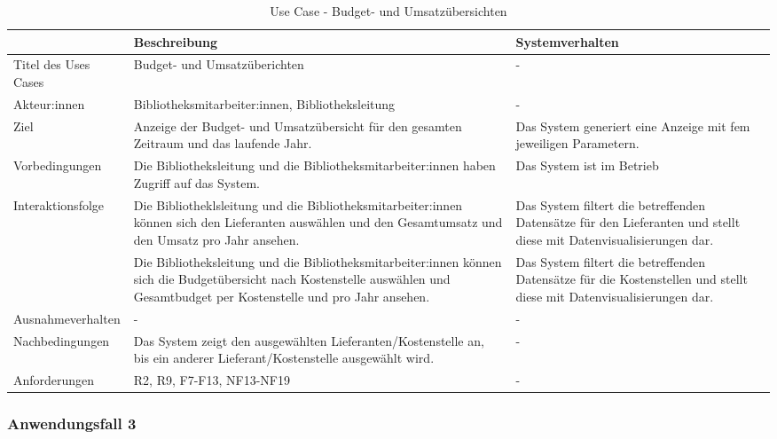 \begingroup
\setlength{\tabcolsep}{10pt} %
\renewcommand{\arraystretch}{1.25} 
\begin{table}[H]
    \centering
    \begin{adjustbox}{max width=\textwidth}
    \begin{tabular}{lp{6.5cm}p{6.5cm}}
       \toprule
       \textbf{}          & \textbf{Beschreibung} &\textbf{Systemverhalten}\\
       \midrule
        Titel des Uses Cases             &Budget- und Umsatzüberichten  & -\\
        Akteur:innen                     &Bibliotheksmitarbeiter:innen, Bibliotheksleitung & -\\
        Ziel                             &Anzeige der Budget- und Umsatzübersicht für den gesamten Zeitraum und das laufende Jahr. & Das System generiert eine Anzeige mit fem jeweiligen Parametern.\\
        Vorbedingungen                   &Die Bibliotheksleitung und die Bibliotheksmitarbeiter:innen haben Zugriff auf das System.& Das System ist im Betrieb\\
        Interaktionsfolge                &Die Bibliotheklsleitung und die Bibliotheksmitarbeiter:innen  können sich den Lieferanten auswählen und den Gesamtumsatz und den Umsatz pro Jahr ansehen. & Das System filtert die betreffenden Datensätze für den Lieferanten und stellt diese mit Datenvisualisierungen dar.\\
                                        &Die Bibliotheksleitung und die Bibliotheksmitarbeiter:innen können sich die Budgetübersicht nach Kostenstelle auswählen und Gesamtbudget per Kostenstelle und pro Jahr ansehen.& Das System filtert die betreffenden Datensätze für die Kostenstellen  und stellt diese mit Datenvisualisierungen dar.\\
        Ausnahmeverhalten               &- & -\\
        Nachbedingungen                 &Das System zeigt den ausgewählten Lieferanten/Kostenstelle an, bis ein anderer Lieferant/Kostenstelle ausgewählt wird. & -\\

        Anforderungen                   &R2, R9, F7-F13, NF13-NF19& -\\
        \bottomrule
    \end{tabular}
    \end{adjustbox}
    \caption{%
    Use Case - Budget- und Umsatzübersichten
    }
    \label{tab:UC_budget}
    \end{table}
\endgroup

\subsubsection{Anwendungsfall 3}

